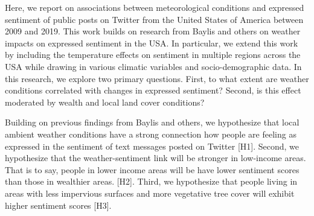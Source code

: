 \documentclass{article}
\begin{document}
Here, we report on associations between meteorological conditions and expressed sentiment of public posts on Twitter from the United States of America between 2009 and 2019. This work builds on research from Baylis and others \cite{baylis_weather_2018} on weather impacts on expressed sentiment in the USA. In particular, we extend this work by including the temperature effects on sentiment in multiple regions across the USA while drawing in various climatic variables and socio-demographic data. In this research, we explore two primary questions. First, to what extent are weather conditions correlated with changes in expressed sentiment? Second, is this effect moderated by wealth and local land cover conditions?

Building on previous findings from Baylis and others, we hypothesize that local ambient weather conditions have a strong connection how people are feeling as expressed in the sentiment of text messages posted on Twitter [H1]. Second, we hypothesize that the weather-sentiment link will be stronger in low-income areas. That is to say, people in lower income areas will be have lower sentiment scores than those in wealthier areas. [H2]. Third, we hypothesize that people living in areas with less impervious surfaces and more vegetative tree cover will exhibit higher sentiment scores [H3].
\end{document}
